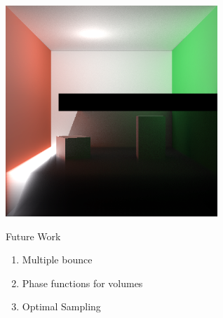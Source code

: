 \documentclass[10pt,compress,professionalfont]{beamer}
\begin{document}
\begin{frame}[c]{}

    {\centering
    \includegraphics[width=80mm]{../img/one_side_corrected}\\
    }

\end{frame}



\begin{frame}{Future Work}

    \begin{enumerate}
        \item Multiple bounce
        \item Phase functions for volumes
        \item Optimal Sampling
    \end{enumerate}

\end{frame}
\end{document}
